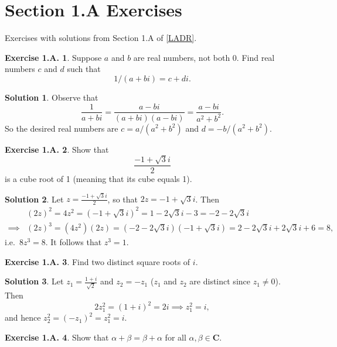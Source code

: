 \documentclass[12pt]{article}
\theoremstyle{definition}
\theoremstyle{exercise}
\newtheorem{exercise}{Exercise 1.A.}
\theoremstyle{solution}
\newtheorem*{solution}{Solution}
\newcommand{\C}{\mathbf{C}}
\begin{document}
\section{Section 1.A Exercises}

Exercises with solutions from Section 1.A of \hyperlink{ladr}{[LADR]}.

\begin{exercise}
\label{ex:1}
    Suppose \( a \) and \( b \) are real numbers, not both 0. Find real numbers \( c \) and \( d \) such that
    \[
        1/(a + bi) = c + di.
    \]
\end{exercise}

\begin{solution}
    Observe that
    \[
        \frac{1}{a + bi} = \frac{a - bi}{(a + bi)(a - bi)} = \frac{a - bi}{a^2 + b^2}.
    \]
    So the desired real numbers are \( c = a/(a^2 + b^2) \) and \( d = -b/(a^2 + b^2) \).
\end{solution}

\begin{exercise}
\label{ex:2}
    Show that
    \[
        \frac{-1 + \sqrt{3} i}{2}
    \]
    is a cube root of 1 (meaning that its cube equals 1).
\end{exercise}

\begin{solution}
    Let \( z = \tfrac{-1 + \sqrt{3} i}{2} \), so that \( 2z = -1 + \sqrt{3} i \). Then
    \begin{align*}
        & (2z)^2 = 4z^2 = (-1 + \sqrt{3} i)^2 = 1 - 2 \sqrt{3} i - 3 = -2 - 2 \sqrt{3} i \\
        \implies & (2z)^3 = (4z^2)(2z) = (-2 - 2 \sqrt{3} i)(-1 + \sqrt{3}i) = 2 - 2 \sqrt{3} i + 2 \sqrt{3} i + 6 = 8,
    \end{align*}
    i.e.\ \( 8z^3 = 8 \). It follows that \( z^3 = 1 \).
\end{solution}

\begin{exercise}
\label{ex:3}
    Find two distinct square roots of \( i \).
\end{exercise}

\begin{solution}
    Let \( z_1 = \frac{1 + i}{\sqrt{2}} \) and \( z_2 = -z_1 \) (\( z_1 \) and \( z_2 \) are distinct since \( z_1 \neq 0 \)). Then
    \[
    2 z_1^2 = (1 + i)^2 = 2i \implies z_1^2 = i,
    \]
    and hence \( z_2^2 = (-z_1)^2 = z_1^2 = i \).
\end{solution}

\begin{exercise}
\label{ex:4}
    Show that \( \alpha + \beta = \beta + \alpha \) for all \( \alpha, \beta \in \C \).
\end{exercise}
\end{document}
